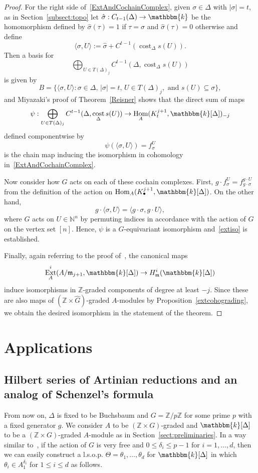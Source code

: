 \documentclass[10pt]{amsart}
\theoremstyle{definition}
\DeclareMathOperator\cost{cost}
\DeclareMathOperator{\Hom}{Hom}
\DeclareMathOperator{\Ext}{Ext}
\newcommand{\field}{\mathbbm{k}}
\newcommand{\NN}{{\mathbb N}}
\newcommand{\ZZ}{{\mathbb Z}}
\newcommand{\mideal}{\ensuremath{\mathfrak{m}}}
\begin{document}
\begin{proof}
For the right side of~\eqref{ExtAndCochainComplex}, given $\sigma\in \Delta$ with $|\sigma|=t$, as in Section~\ref{subsect:topo} let $\hat{\sigma}:C_{t-1}(\Delta)\to\field$ be the homomorphism defined by $\hat{\sigma}(\tau)=1$ if $\tau=\sigma$ and $\hat{\sigma}(\tau)=0$ otherwise and define
\[
\langle \sigma, U\rangle:=\hat{\sigma}+C^{t-1}(\cost_\Delta s(U)).
\]
Then a basis for
\[
\bigoplus_{U\in T(\Delta)_j}C^{t-1}(\Delta, \cost_\Delta s(U))
\]
is given by
\[
B=\{\langle \sigma, U\rangle : \sigma\in\Delta, \, |\sigma|=t, \, U\in T(\Delta)_j, \text{ and } s(U)\subseteq \sigma\},
\]
and Miyazaki's proof of Theorem~\ref{Reisner} shows that the direct sum of maps
\[
\psi:\bigoplus_{U\in T(\Delta)_j}C^{t-1}(\Delta, \cost_\Delta s(U))\to \Hom_A(K_t^{j+1}, \field[\Delta])_{-j}
\]
defined componentwise by
\[
\psi(\langle \sigma, U\rangle)=f_{\sigma}^U
\]
is the chain map inducing the isomorphism in cohomology in~\eqref{ExtAndCochainComplex}.

Now consider how $G$ acts on each of these cochain complexes. First, $g\cdot f_\sigma^U=f_{g\cdot \sigma}^{g\cdot U}$ from the definition of the action on $\Hom_A(K_\bullet^{j+1}, \field[\Delta])$. On the other hand,
\[
g\cdot\langle \sigma, U\rangle=\langle g \cdot \sigma, g\cdot U\rangle,
\]
where $G$ acts on $U\in\NN^n$ by permuting indices in accordance with the action of $G$ on the vertex set $[n]$. Hence, $\psi$ is a $G$-equivariant isomorphism and~\eqref{extiso} is established.

Finally, again referring to the proof of~\cite[Theorem~1]{characterizations}, the canonical maps
\[
\Ext_A^i(A/\mideal_{j+1}, \field[\Delta])\to H_\mideal^i(\field[\Delta])
\]
induce isomorphisms in $\ZZ$-graded components of degree at least $-j$. Since these are also maps of $(\ZZ\times \hat{G})$-graded $A$-modules by Proposition~\ref{extcohograding}, we obtain the desired isomorphism in the statement of the theorem.
\end{proof}


\section{Applications}\label{Applications}

\subsection{Hilbert series of Artinian reductions and an analog of Schenzel's formula}\label{SchenzelSection}
From now on, $\Delta$ is fixed to be Buchsbaum and $G=\ZZ/p\ZZ$ for some prime $p$ with a fixed generator $g$. We consider $A$ to be $(\ZZ\times G)$-graded and $\field[\Delta]$ to be a $(\ZZ\times G)$-graded $A$-module as in Section~\ref{sect:preliminaries}. In a way similar to~\cite[Section~8]{St-96}, if the action of $G$ is very free and $0\le \delta_i\le p-1$ for $i=1, \ldots, d$, then we can easily construct a l.s.o.p. $\Theta=\theta_1, \ldots, \theta_d$ for $\field[\Delta]$ in which $\theta_i\in A_1^{\delta_i}$ for $1\le i \le d$ as follows.
\end{document}
